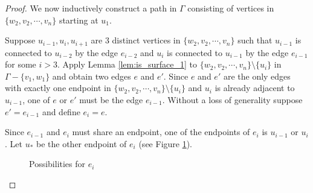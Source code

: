 \begin{proof}
    We now inductively construct a path in \(\Gamma\)
    consisting of vertices in \(\{w_2, v_2, \cdots, v_n\}\) starting at \(u_1\).

    Suppose \(u_{i-1}, u_i, u_{i+1}\) are 3 distinct vertices in \(\{w_2, v_2, \cdots, v_n\}\) such that
    \(u_{i-1}\) is connected to \(u_{i-2}\) by the edge \(e_{i-2}\)
    and \(u_i\) is connected to \(u_{i-1}\) by the edge \(e_{i-1}\) for some \(i > 3\).
    Apply Lemma \ref{lem:is_surface_1} to \(\{w_2, v_2, \cdots, v_n\}\setminus\{u_i\}\) in \(\Gamma - \{v_1, w_1\}\) and obtain
    two edges \(e\) and \(e'\).
    Since \(e\) and \(e'\) are 
    the only edges with exactly one endpoint in \(\{w_2, v_2, \cdots, v_n\}\setminus\{u_i\}\)
    and  \(u_i\) is already adjacent to \(u_{i-1}\), one of \(e\) or \(e'\) must
    be the edge \(e_{i-1}\).
    Without a loss of generality suppose \(e' = e_{i-1}\) and define \(e_i = e\).

    Since \(e_{i-1}\) and \(e_{i}\) must share an endpoint,
    one of the endpoints of \(e_i\) is \(u_{i-1}\) or \(u_i\). 
    Let \(u_*\) be the other endpoint of \(e_i\) (see Figure \ref{fig:lem:is_surface_2_5}).

    \begin{figure}[h!]
        \centering
        \quad\quad
        \caption{Possibilities for \(e_i\)}
        \label{fig:lem:is_surface_2_5}
    \end{figure}


\end{proof}
